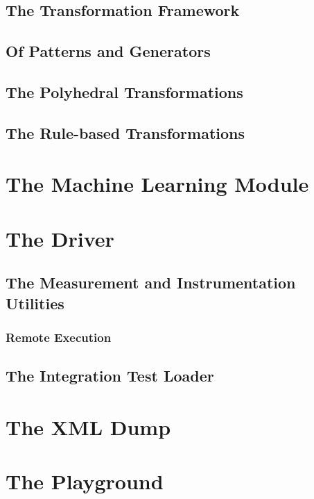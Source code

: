\subsection{The Transformation Framework}
\subsection{Of Patterns and Generators}
\subsection{The Polyhedral Transformations}
\subsection{The Rule-based Transformations}

\section{The Machine Learning Module}

\section{The Driver}
\subsection{The Measurement and Instrumentation Utilities}
\subsubsection{Remote Execution}
\subsection{The Integration Test Loader}

\section{The XML Dump}
\section{The Playground}
